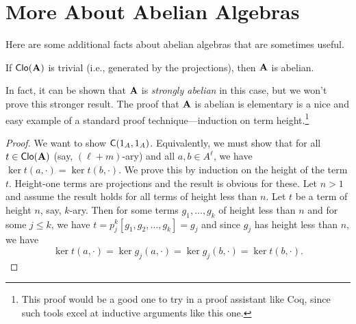 \section{More About Abelian Algebras}
\label{sec:abelian-algebras}
Here are some additional facts about abelian algebras that are sometimes useful.

\begin{lem}
If $\operatorname{\mathsf{Clo}}(\mathbf{A})$ is trivial (i.e., generated by the projections),
then $\mathbf{A}$ is abelian.
\end{lem}
In fact, it can be shown that $\mathbf{A}$ is \emph{strongly abelian} in this case, but
we won't prove this stronger result. The proof that $\mathbf{A}$ is abelian is
elementary is a nice and easy example of a standard proof technique---induction on
term height.\footnote{This proof would be a good one to try in a proof assistant
  like Coq, since such tools excel at inductive arguments like this one.}
\begin{proof}
We want to show $\mathsf{C}(1_A, 1_A)$.  Equivalently, we must show
that for all $t\in \operatorname{\mathsf{Clo}}(\mathbf{A})$ (say, $(\ell+m)$-ary) 
and all $a, b \in A^\ell$, we have $\ker t(a,\cdot)=\ker t(b,\cdot)$.
We prove this by induction on the height of the term $t$.  Height-one terms are
projections and the result is obvious for these.  Let $n>1$ and assume the result
holds for all terms  of height less than
$n$.  Let $t$ be a term of height $n$, say, $k$-ary.  Then for some terms 
$g_1, \dots, g_k$ of height less than $n$ and for some $j\leq k$, we have
$t = p^k_j [g_1, g_2, \dots, g_k] = g_j$ and since $g_j$ has height less than
$n$, we have
\[
\ker t(a,\cdot)=\ker g_j(a,\cdot) = \ker g_j(b,\cdot)=\ker t(b,\cdot).
\]\end{proof}


